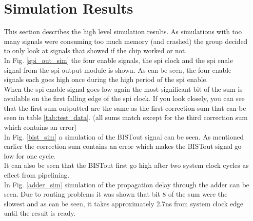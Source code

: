 \section{Simulation Results} \label{sec:simulation_results}
This section describes the high level simulation results. As simulations with too many signals were consuming too much memory (and crashed) the group decided to only look at signals that showed if the chip worked or not.\\






In Fig. \ref{spi_out_sim} the four enable signals, the spi clock and the spi enale signal from the spi output module is shown. As can be seen, the four enable signals each goes high once during the high period of the spi enable.\\
When the spi enable signal goes low again the most significant bit of the sum is available on the first falling edge of the spi clock. If you look closely, you can see that the first sum outputted are the same as the first correction sum that can be seen in table \ref{tab:test_data}. (all sums match except for the third correction sum which contains an error)\\

In Fig. \ref{bist_sim} a simulation of the BISTout signal can be seen. As mentioned earlier the correction sum contains an error which makes the BISTout signal go low for one cycle. \\
It can also be seen that the BISTout first go high after two system clock cycles as effect from pipelining.\\

In Fig. \ref{adder_sim} simulation of the propagation delay through the adder can be seen. Due to routing problems it was shown that bit 8 of the sum were the slowest and as can be seen, it takes approximately 2.7ns from system clock edge until the result is ready. 





